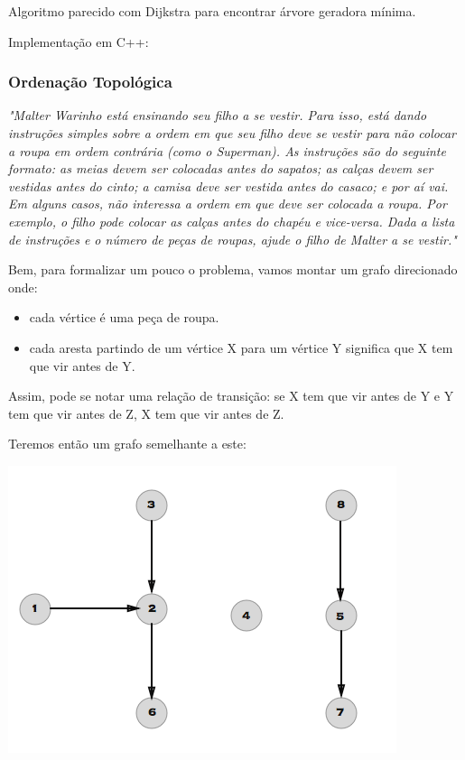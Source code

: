\documentclass[a4paper,12pt]{article}
\begin{document}
Algoritmo parecido com Dijkstra para encontrar árvore geradora mínima.

\noindent Implementação em C++:

\subsubsection{Ordenação Topológica}

\textit{"Malter Warinho está ensinando seu filho a se vestir. Para isso, está dando instruções simples sobre a ordem em que seu filho deve se vestir para não colocar a roupa em ordem contrária (como o Superman). As instruções são do seguinte formato: as meias devem ser colocadas antes do sapatos; as calças devem ser vestidas antes do cinto; a camisa deve ser vestida antes do casaco; e por aí vai. Em alguns casos, não interessa a ordem em que deve ser colocada a roupa. Por exemplo, o filho pode colocar as calças antes do chapéu e vice-versa. Dada a lista de instruções e o número de peças de roupas, ajude o filho de Malter a se vestir."}\newline

\noindent Bem, para formalizar um pouco o problema, vamos montar um grafo direcionado onde:

\begin{itemize}
    \item cada vértice é uma peça de roupa.
    \item cada aresta partindo de um vértice X para um vértice Y significa que X tem que vir antes de Y.
\end{itemize}

\noindent Assim, pode se notar uma relação de transição: se X tem que vir antes de Y e Y tem que vir antes de Z, X tem que vir antes de Z.

\noindent Teremos então um grafo semelhante a este:

\begin{center}
  \includegraphics[width=\linewidth/2]{figures/grafos/OT.png}
\end{center}
\end{document}
